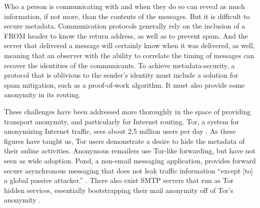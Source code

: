 \documentclass[pageno]{jpaper}
\begin{document}
Who a person is communicating with and when they do so can reveal as much information, if not more, than the contents of the messages. But it is difficult to secure metadata. Communication protocols generally rely on the inclusion of a FROM header to know the return address, as well as to prevent spam. And the server that delivered a message will certainly know when it was delivered, as well, meaning that an observer with the ability to correlate the timing of messages can recover the identities of the communicants. To achieve metadata-security, a protocol that is oblivious to the sender's identity must include a solution for spam mitigation, such as a proof-of-work algorithm. It must also provide some anonymity in its routing.

These challenges have been addressed more thoroughly in the space of providing transport anonymity, and particularly for Internet routing. Tor, a system for anonymizing Internet traffic, sees about 2.5 million users per day \cite{torusers}. As these figures have taught us, Tor users demonstrate a desire to hide the metadata of their online activities. Anonymous remailers use Tor-like forwarding, but have not seen as wide adoption. Pond, a non-email messaging application, provides forward secure asynchronous messaging that does not leak traffic information ``except [to] a global passive attacker.'' \cite{pond}. There also exist SMTP servers that run as Tor hidden services, essentially bootstrapping their mail anonymity off of Tor's anonymity \cite{onionmail}.
\end{document}
